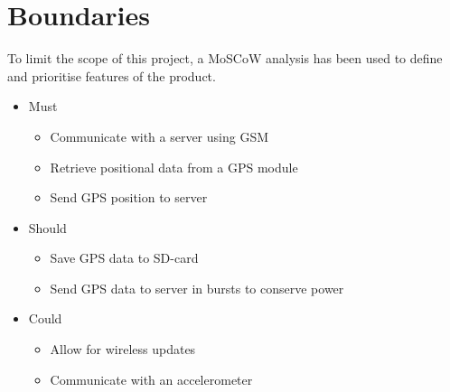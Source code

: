 
\chapter{Boundaries}
\label{sec:Boundaries}
To limit the scope of this project, a MoSCoW analysis has been used to define and prioritise features of the product.

\begin{itemize}
	\item Must
	\begin{itemize}
		\item Communicate with a server using GSM
		\item Retrieve positional data from a GPS module
		\item Send GPS position to server
	\end{itemize}
	\item Should
	\begin{itemize}
		\item Save GPS data to SD-card
		\item Send GPS data to server in bursts to conserve power
	\end{itemize}
	\item Could
	\begin{itemize}
		\item Allow for wireless updates
		\item Communicate with an accelerometer
	\end{itemize}
\end{itemize}
